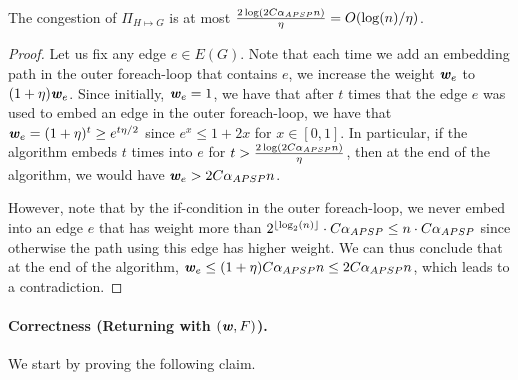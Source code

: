 \begin{lemma}\label{lma:congestion}
The congestion of $\Pi_{H \mapsto G}$ is at most $\frac{2\log(2 C \alpha_{APSP} n)}{\eta} = O(\log(n)/\eta)$.
\end{lemma}
\begin{proof}
Let us fix any edge $e \in E(G)$. Note that each time we add an embedding path in the outer foreach-loop that contains $e$, we increase the weight $\boldsymbol{\mathit{w}}_e$ to $(1+\eta)\boldsymbol{\mathit{w}}_e$. Since initially, $\boldsymbol{\mathit{w}}_e = 1$, we have that after $t$ times that the edge $e$ was used to embed an edge in the outer foreach-loop, we have that $\boldsymbol{\mathit{w}}_e = (1+\eta)^t \geq e^{t\eta/2}$ since $e^x \leq 1+2x$ for $x \in [0,1]$. In particular, if the algorithm embeds $t$ times into $e$ for $t > \frac{2\log(2 C \alpha_{APSP} n)}{\eta}$, then at the end of the algorithm, we would have $\boldsymbol{\mathit{w}}_e > 2 C \alpha_{APSP} n$.

However, note that by the if-condition in the outer foreach-loop, we never embed into an edge $e$ that has weight more than $2^{\lfloor \log_2(n) \rfloor} \cdot C \alpha_{APSP} \leq n \cdot C \alpha_{APSP} $ since otherwise the path using this edge has higher weight. We can thus conclude that at the end of the algorithm, $\boldsymbol{\mathit{w}}_e \leq (1+\eta)C \alpha_{APSP} n \leq 2C \alpha_{APSP} n$, which leads to a contradiction. 
\end{proof}

\paragraph{Correctness (Returning with $(\boldsymbol{\mathit{w}}, F)$).} We start by proving the following claim.

